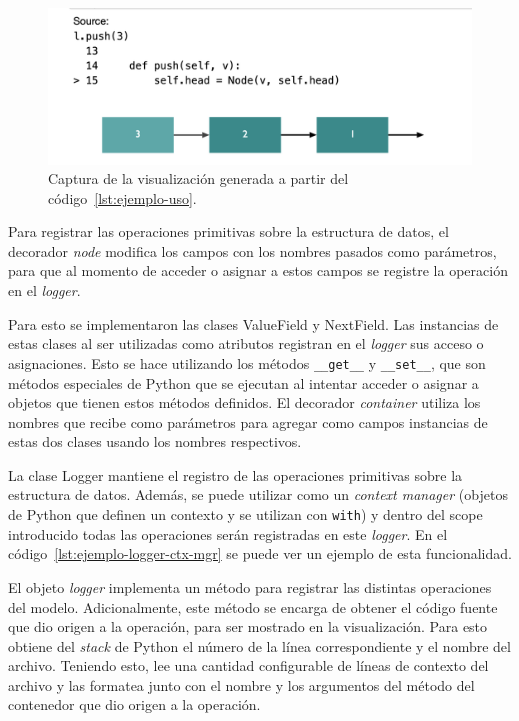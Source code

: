 \begin{figure}[h!]
    \centering
    \includegraphics[width=\linewidth]{imagenes/ejemplos/ejemplo}
    \caption{Captura de la visualización generada a partir del código~\ref{lst:ejemplo-uso}.}
    \label{fig:visualizacion_ej}
    \centering
\end{figure}

Para registrar las operaciones primitivas sobre la estructura de datos, el decorador \textit{node} modifica los campos con los nombres pasados como parámetros, para que al momento de acceder o asignar a estos campos se registre la operación en el \textit{logger}.

Para esto se implementaron las clases ValueField y NextField. Las instancias de estas clases al ser utilizadas como atributos registran en el \textit{logger} sus acceso o asignaciones. Esto se hace utilizando los métodos \texttt{\_\_get\_\_} y \texttt{\_\_set\_\_}, que son métodos especiales de Python que se ejecutan al intentar acceder o asignar a objetos que tienen estos métodos definidos. El decorador \textit{container} utiliza los nombres que recibe como parámetros para agregar como campos instancias de estas dos clases usando los nombres respectivos.

La clase Logger mantiene el registro de las operaciones primitivas sobre la estructura de datos. Además, se puede utilizar como un \textit{context manager} (objetos de Python que definen un contexto y se utilizan con \texttt{with}) y dentro del scope introducido todas las operaciones serán registradas en este \textit{logger}. En el código~\ref{lst:ejemplo-logger-ctx-mgr} se puede ver un ejemplo de esta funcionalidad.

El objeto \textit{logger} implementa un método para registrar las distintas operaciones del modelo. Adicionalmente, este método se encarga de obtener el código fuente que dio origen a la operación, para ser mostrado en la visualización. Para esto obtiene del \textit{stack} de Python el número de la línea correspondiente y el nombre del archivo. Teniendo esto, lee una cantidad configurable de líneas de contexto del archivo y las formatea junto con el nombre y los argumentos del método del contenedor que dio origen a la operación.

